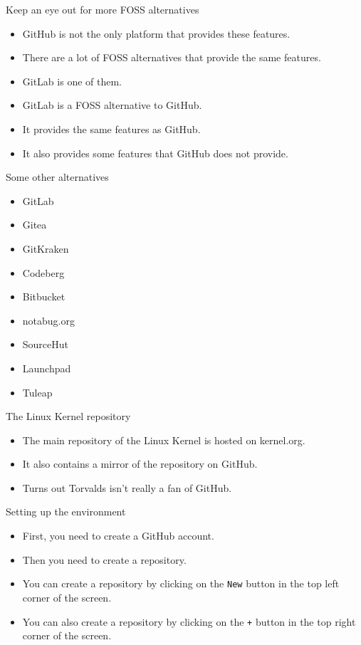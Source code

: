 \documentclass{beamer}
\begin{document}
\begin{frame}{Keep an eye out for more FOSS alternatives}
    \begin{itemize}
        \item GitHub is not the only platform that provides these features.
        \item There are a lot of FOSS alternatives that provide the same features.
        \item GitLab is one of them.
        \item GitLab is a FOSS alternative to GitHub.
        \item It provides the same features as GitHub.
        \item It also provides some features that GitHub does not provide.
    \end{itemize}
\end{frame}

\begin{frame}{Some other alternatives}
    \begin{itemize}
        \item GitLab
        \item Gitea
        \item GitKraken
        \item Codeberg
        \item Bitbucket
        \item notabug.org
        \item SourceHut
        \item Launchpad
        \item Tuleap
    \end{itemize}
\end{frame}

\begin{frame}{The Linux Kernel repository}
    \begin{itemize}
        \item The main repository of the Linux Kernel is hosted on kernel.org.
        \item It also contains a mirror of the repository on GitHub.
        \item Turns out Torvalds isn't really a fan of GitHub.
    \end{itemize}
\end{frame}

\begin{frame}{Setting up the environment}
    \begin{itemize}
        \item First, you need to create a GitHub account.
        \item Then you need to create a repository.
        \item You can create a repository by clicking on the \texttt{New} button in the top left corner of the screen.
        \item You can also create a repository by clicking on the \texttt{+} button in the top right corner of the screen.
    \end{itemize}
\end{frame}
\end{document}
